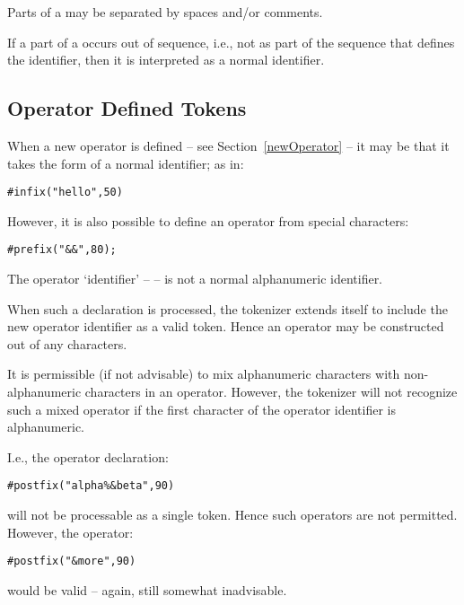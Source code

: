 Parts of a  may be separated by spaces and/or comments.

If a part of a  occurs out of sequence, i.e., not as part of the sequence that defines the identifier, then it is interpreted as a normal  identifier.

\subsection{Operator Defined Tokens}
\label{operatorDefinedTokens}

When a new operator is defined -- see Section~\vref{newOperator} -- it may be that it takes the form of a normal identifier; as in:
\begin{alltt}
\#infix("hello",50)
\end{alltt}
However, it is also possible to define an operator from special characters:
\begin{alltt}
\#prefix("&&",80);
\end{alltt}
The operator `identifier' -- \q{\&\&} -- is not a normal alphanumeric identifier.

When such a declaration is processed, the tokenizer extends itself to include the new operator identifier as a valid token. Hence an operator may be constructed out of any characters.

\begin{aside}
It is permissible (if not advisable) to mix alphanumeric characters with non-alphanumeric characters in an operator. However, the tokenizer will not recognize such a mixed operator if the first character of the operator identifier is alphanumeric.

I.e., the operator declaration:
\begin{alltt}
\#postfix("alpha\%\&beta",90)
\end{alltt}
will not be processable as a single token. Hence such operators are not permitted. However, the operator:
\begin{alltt}
\#postfix("\&more",90)
\end{alltt}
would be valid -- again, still somewhat inadvisable.
\end{aside}